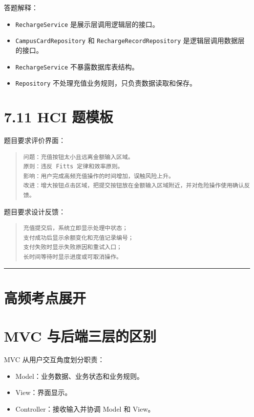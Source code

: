 \documentclass[UTF8,zihao=-4]{ctexart}
\begin{document}
答题解释：

\begin{itemize}
\item \texttt{RechargeService} 是展示层调用逻辑层的接口。
\item \texttt{CampusCardRepository} 和 \texttt{RechargeRecordRepository} 是逻辑层调用数据层的接口。
\item \texttt{RechargeService} 不暴露数据库表结构。
\item \texttt{Repository} 不处理充值业务规则，只负责数据读取和保存。
\end{itemize}

\section{7.11 HCI 题模板}

题目要求评价界面：

\begin{quote}
\footnotesize
\begin{verbatim}
问题：充值按钮太小且远离金额输入区域。
原则：违反 Fitts 定律和效率原则。
影响：用户完成高频充值操作的时间增加，误触风险上升。
改进：增大按钮点击区域，把提交按钮放在金额输入区域附近，并对危险操作使用确认反馈。
\end{verbatim}
\end{quote}

题目要求设计反馈：

\begin{quote}
\footnotesize
\begin{verbatim}
充值提交后，系统立即显示处理中状态；
支付成功后显示余额变化和充值记录编号；
支付失败时显示失败原因和重试入口；
长时间等待时显示进度或可取消操作。
\end{verbatim}
\end{quote}

\bigskip\hrule\bigskip

\section{高频考点展开}

\section{MVC 与后端三层的区别}

MVC 从用户交互角度划分职责：

\begin{itemize}
\item Model：业务数据、业务状态和业务规则。
\item View：界面显示。
\item Controller：接收输入并协调 Model 和 View。
\end{itemize}
\end{document}
